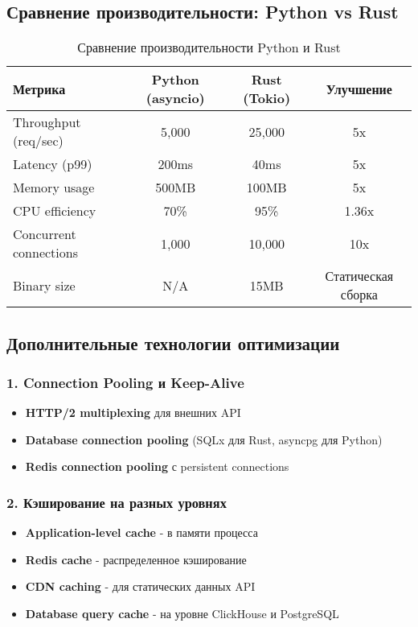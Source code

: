 \documentclass[11pt,a4paper]{article}
\begin{document}
\subsection{Сравнение производительности: Python vs Rust}

\begin{table}[H]
\centering
\small
\begin{tabular}{|l|c|c|c|}
\hline
\textbf{Метрика} & \textbf{Python (asyncio)} & \textbf{Rust (Tokio)} & \textbf{Улучшение} \\
\hline
Throughput (req/sec) & 5,000 & 25,000 & 5x \\
Latency (p99) & 200ms & 40ms & 5x \\
Memory usage & 500MB & 100MB & 5x \\
CPU efficiency & 70\% & 95\% & 1.36x \\
Concurrent connections & 1,000 & 10,000 & 10x \\
Binary size & N/A & 15MB & Статическая сборка \\
\hline
\end{tabular}
\caption{Сравнение производительности Python и Rust}
\end{table}

\subsection{Дополнительные технологии оптимизации}

\subsubsection{1. Connection Pooling и Keep-Alive}
\begin{itemize}
    \item \textbf{HTTP/2 multiplexing} для внешних API
    \item \textbf{Database connection pooling} (SQLx для Rust, asyncpg для Python)
    \item \textbf{Redis connection pooling} с persistent connections
\end{itemize}

\subsubsection{2. Кэширование на разных уровнях}
\begin{itemize}
    \item \textbf{Application-level cache} - в памяти процесса
    \item \textbf{Redis cache} - распределенное кэширование
    \item \textbf{CDN caching} - для статических данных API
    \item \textbf{Database query cache} - на уровне ClickHouse и PostgreSQL
\end{itemize}
\end{document}
